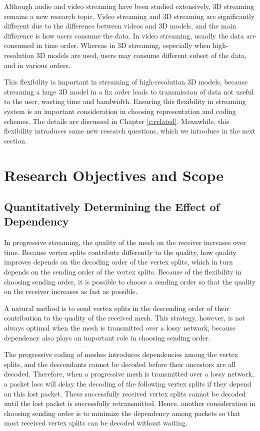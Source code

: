     Although audio and video streaming have been studied extensively, 
    3D streaming remains a new research topic. 
    Video streaming and 3D streaming are significantly different
    due to the difference between videos and 3D models, and
    the main difference is how users consume the data.
    In video streaming, usually the data are consumed in time order. 
    Whereas in 3D streaming, especially when high-resolution 3D models are used,
    users may consume different subset of the data, and in various orders.
    
    This flexibility is important in streaming of high-resolution 3D models, 
    because streaming a huge 3D model in a fix order leads to transmission of data not
    useful to the user, wasting time and bandwidth.
    Ensuring this flexibility in streaming system is an important consideration
    in choosing representation and coding schemes. The details are discussed
    in Chapter \ref{c:related}.
    Meanwhile, this flexibility introduces some new research questions, 
    which we introduce in the next section. 

  \section{Research Objectives and Scope}
  \label{s:intro:objectives}
    \subsection{Quantitatively Determining the Effect of Dependency}
    In progressive streaming, the quality of the mesh on the receiver
    increases over time.
    Because vertex splits contribute differently to the quality, 
    how quality improves
    depends on the decoding order of the vertex splits,
    which in turn depends on the sending order of the vertex splits.
    Because of the flexibility in choosing sending order,
    it is possible to choose a sending order so that the 
    quality on the receiver increases as fast as possible.

    A natural method is to send vertex splits in the descending order
    of their contribution to the quality of the received mesh. 
    This strategy, however, is not always optimal 
    when the mesh is transmitted over a lossy network,
    because dependency also plays an important role in choosing sending order.
    
    The progressive coding of meshes introduces dependencies among 
    the vertex splits, and the descendants cannot be decoded
    before their ancestors are all decoded. Therefore, 
    when a progressive mesh is transmitted over a lossy network,
    a packet loss will delay the decoding of the following
    vertex splits if they depend on this lost packet. 
    These successfully received vertex splits cannot be 
    decoded until the lost packet is successfully retransmitted. 
    Hence, another consideration in choosing sending order
    is to minimize the dependency among packets so that most
    received vertex splits can be decoded without waiting.
    
